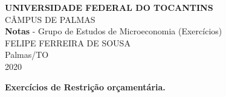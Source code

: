 \documentclass[a4paper, 12pt]{article} %
\begin{document}
\begin{center}
	\textbf{UNIVERSIDADE FEDERAL DO TOCANTINS}\\[5pt]
	CÂMPUS DE PALMAS\\[240pt]
	
	\textbf{Notas} -  Grupo de Estudos de Microeconomia (Exercícios)\\[240pt]
          
	FELIPE FERREIRA DE SOUSA \\[140pt]
	Palmas/TO\\[2pt]
	2020\\ \singlespacing
\end{center}

\begin{center}

\textbf{Exercícios de Restrição orçamentária. } \singlespacing


\end{center}
\end{document}

